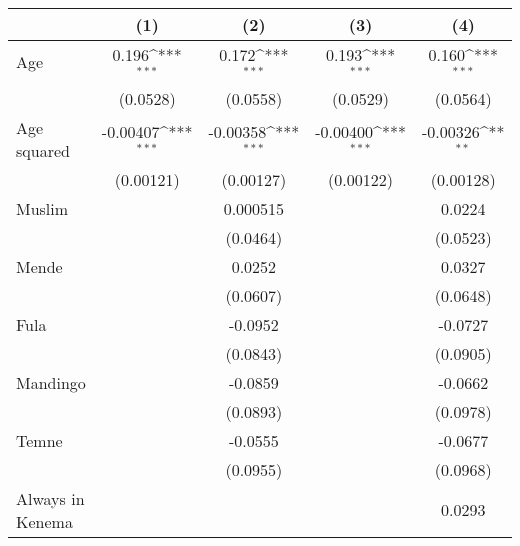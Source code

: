 {
\def\sym#1{\ifmmode^{#1}\else\(^{#1}\)\fi}
\begin{tabular}{l*{4}{c}}
\hline\hline
                    &\multicolumn{1}{c}{(1)}         &\multicolumn{1}{c}{(2)}         &\multicolumn{1}{c}{(3)}         &\multicolumn{1}{c}{(4)}         \\
\hline
Age                 &       0.196\sym{***}&       0.172\sym{***}&       0.193\sym{***}&       0.160\sym{***}\\
                    &    (0.0528)         &    (0.0558)         &    (0.0529)         &    (0.0564)         \\
[1em]
Age squared         &    -0.00407\sym{***}&    -0.00358\sym{***}&    -0.00400\sym{***}&    -0.00326\sym{**} \\
                    &   (0.00121)         &   (0.00127)         &   (0.00122)         &   (0.00128)         \\
[1em]
Muslim              &                     &    0.000515         &                     &      0.0224         \\
                    &                     &    (0.0464)         &                     &    (0.0523)         \\
[1em]
Mende               &                     &      0.0252         &                     &      0.0327         \\
                    &                     &    (0.0607)         &                     &    (0.0648)         \\
[1em]
Fula                &                     &     -0.0952         &                     &     -0.0727         \\
                    &                     &    (0.0843)         &                     &    (0.0905)         \\
[1em]
Mandingo            &                     &     -0.0859         &                     &     -0.0662         \\
                    &                     &    (0.0893)         &                     &    (0.0978)         \\
[1em]
Temne               &                     &     -0.0555         &                     &     -0.0677         \\
                    &                     &    (0.0955)         &                     &    (0.0968)         \\
[1em]
Always in Kenema    &                     &                     &                     &      0.0293         \\

\end{tabular}}

